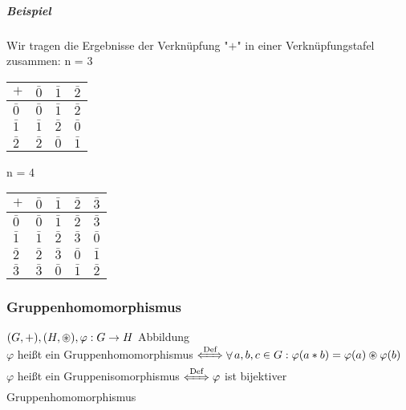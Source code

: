 \documentclass[a4paper]{scrartcl}
\DeclareMathOperator{\Forall}{\forall}
\theoremstyle{definition}
\theoremstyle{plain}
\theoremstyle{plain}
\theoremstyle{remark}
\theoremstyle{remark}
\theoremstyle{remark}
\theoremstyle{remark}
\theoremstyle{remark}
\begin{document}
\subparagraph{Beispiel}
\label{sec-3-1-7-4-2}
Wir tragen die Ergebnisse der Verknüpfung "$+$" in einer Verknüpfungstafel zusammen:
n = 3
\begin{center}
\begin{tabular}{llll}
$+$ & $\bar 0$ & $\bar 1$ & $\bar 2$\\
\hline
$\bar 0$ & $\bar 0$ & $\bar 1$ & $\bar 2$\\
$\bar 1$ & $\bar 1$ & $\bar 2$ & $\bar 0$\\
$\bar 2$ & $\bar 2$ & $\bar 0$ & $\bar 1$\\
\end{tabular}
\end{center}

n = 4
\begin{center}
\begin{tabular}{lllll}
$+$ & $\bar 0$ & $\bar 1$ & $\bar 2$ & $\bar 3$\\
\hline
$\bar 0$ & $\bar 0$ & $\bar 1$ & $\bar 2$ & $\bar 3$\\
$\bar 1$ & $\bar 1$ & $\bar 2$ & $\bar 3$ & $\bar 0$\\
$\bar 2$ & $\bar 2$ & $\bar 3$ & $\bar 0$ & $\bar 1$\\
$\bar 3$ & $\bar 3$ & $\bar 0$ & $\bar 1$ & $\bar 2$\\
\end{tabular}
\end{center}
\subsubsection{Gruppenhomomorphismus}
\label{sec-3-1-8}
$(G,+),(H,\oast), \varphi : G \to H$ Abbildung \\
    $\varphi$ heißt ein Gruppenhomomorphismus $\xLeftrightarrow{\text{Def}} \Forall a,b,c\in G: \varphi(a*b) = \varphi(a) \oast \varphi(b)$ \\
    $\varphi$ heißt ein Gruppenisomorphismus $\xLeftrightarrow{\text{Def}} \varphi$ ist bijektiver Gruppenhomomorphismus
\end{document}
